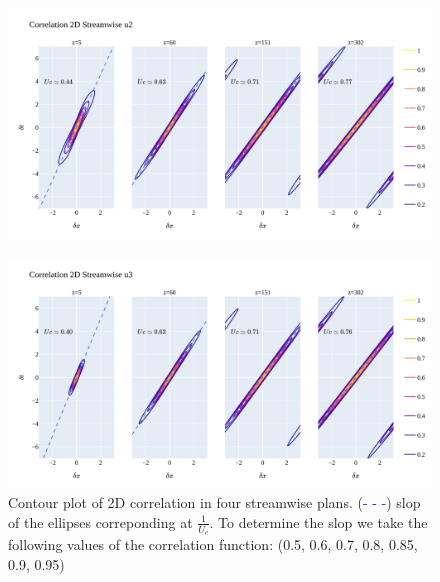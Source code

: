 \documentclass[]{article}
\theoremstyle{plain}
\theoremstyle{remark}
\begin{document}
\begin{figure}[h!]
	\begin{center}
		\includegraphics[width=\textwidth]{../output/split_time/frozen_turbulence/correlation2D/u2.png}
		
	\end{center}
\end{figure}

\begin{figure}[h!]
	\begin{center}
		\includegraphics[width=\textwidth]{../output/split_time/frozen_turbulence/correlation2D/u3.png}
		\caption{Contour plot of 2D correlation in four streamwise plans. (\textcolor{blue}{- - -}) slop of the ellipses correponding at $\frac{1}{U_c}$. To determine the slop we take the following values of the correlation function: (0.5, 0.6, 0.7, 0.8, 0.85, 0.9, 0.95)}
	\end{center}
\end{figure}
\end{document}
